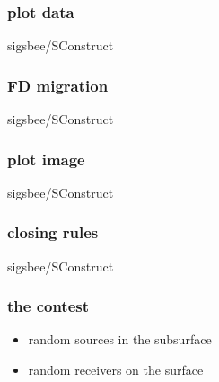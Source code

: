 \begin{frame} \frametitle{plot data}
\normalsize 

		{sigsbee/SConstruct}
\end{frame}
\cwpnote{}
\begin{frame}  \end{frame} \cwpnote{}

\begin{frame} \frametitle{FD migration}
\normalsize 

		{sigsbee/SConstruct}
\end{frame}
\cwpnote{}

\begin{frame} \frametitle{plot image}
\normalsize 

		{sigsbee/SConstruct}
\end{frame}
\cwpnote{}
\begin{frame}  \end{frame} \cwpnote{}

\begin{frame} \frametitle{closing rules}
\normalsize 

		{sigsbee/SConstruct}
\end{frame}
\cwpnote{}


\begin{frame} \frametitle{the contest}

\begin{itemize}
   \item random sources in the subsurface
   \item random receivers on the surface
\end{itemize}

\end{frame}
\cwpnote{}

\begin{frame}


\vfill

\begin{center}
\end{center}

\end{frame}
\cwpnote{}

